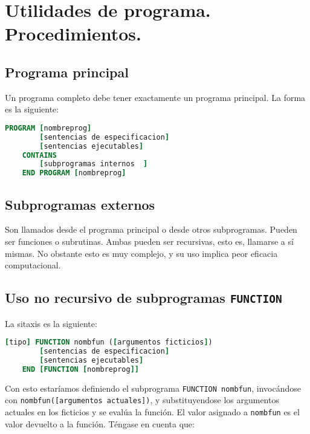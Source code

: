 \section{Utilidades de programa. Procedimientos.}

\subsection{Programa principal}

Un programa completo debe tener exactamente un programa principal. La forma es la siguiente:

\begin{lstlisting}[language=Fortran]
	PROGRAM [nombreprog]
		[sentencias de especificacion]
		[sentencias ejecutables]
	CONTAINS
		[subprogramas internos	]
	END PROGRAM [nombreprog]	
\end{lstlisting}

\subsection{Subprogramas externos}

Son llamados desde el programa principal o desde otros subprogramas. Pueden ser funciones o subrutinas. Ambas pueden ser recursivas, esto es, llamarse a sí mismas. No obstante esto es muy complejo, y su uso implica peor eficacia computacional. 

\subsection{Uso no recursivo de subprogramas {\tt FUNCTION}}

La sitaxis es la siguiente:

\begin{lstlisting}[language=Fortran]
	[tipo] FUNCTION nombfun ([argumentos ficticios])
		[sentencias de especificacion]
		[sentencias ejecutables]
	END [FUNCTION [nombreprog]]
\end{lstlisting}

Con esto estaríamos definiendo el subprograma {\tt FUNCTION nombfun}, invocándose con {\tt nombfun([argumentos actuales])}, y substituyendose los argumentos actuales en los ficticios y se evalúa la función. El valor asignado a {\tt nombfun} es el valor devuelto a la función. Téngase en cuenta que:

